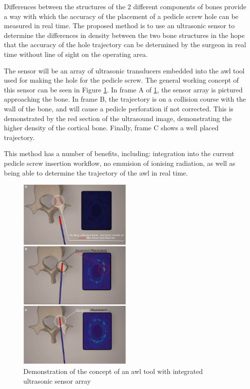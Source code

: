 \documentclass[conference, a4paper]{IEEEtran}
\begin{document}
Differences between the structures of the 2 different components of bones
provide a way with which the accuracy of the placement of a pedicle screw hole
can be measured in real time. The proposed method is to use an ultrasonic 
sensor to determine the differences in density between the two bone structures
in the hope that the accuracy of the hole trajectory can be determined by the
surgeon in real time without line of sight on the operating area. 

The sensor will be an array of ultrasonic transducers embedded into the awl
tool used for making the hole for the pedicle screw. The general working
concept of this sensor can be seen in Figure \ref{fig:ultraArray}.
In frame A of \ref{fig:ultraArray}, the sensor array is pictured approaching
the bone. In frame B, the trajectory is on a collision course with the wall 
of the bone, and will cause a pedicle perforation if not corrected. This
is demonstrated by the red section of the ultrasound image, demonstrating 
the higher density of the cortical bone. Finally, frame C shows a well placed
trajectory.


This method has a number
of benefits, including: integration into the current pedicle screw insertion
workflow, no emmision of ionising radiation, as well as being able to determine
the trajectory of the awl in real time.

\begin{figure}[h!]
	\centering
	\includegraphics[width=0.5\textwidth]{assets/ultraArray.jpg}
	\caption{Demonstration of the concept of an awl tool with integrated ultrasonic sensor array\cite{Manbachi2016}}
	\label{fig:ultraArray}
\end{figure}
\end{document}
